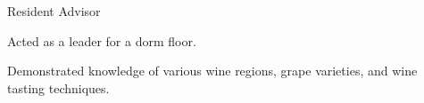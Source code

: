 {
  {Resident Advisor} \hfill{}\newline
}
{\item{Acted as a leader for a dorm floor.}}

{
}
{\item{Demonstrated knowledge of various wine regions, grape varieties, and wine tasting techniques.}}


